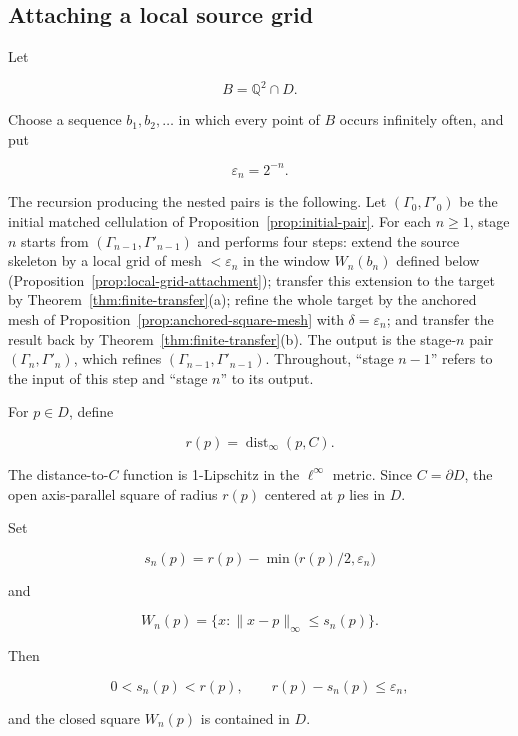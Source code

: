 \documentclass[11pt]{article}
\theoremstyle{mainplain}
\theoremstyle{mainroman}
\theoremstyle{definition}
\numberwithin{equation}{section}
\begin{document}
\subsection{Attaching a local source grid}\label{attaching-a-local-source-grid}

Let

\[
B=\mathbb Q^2\cap D.
\]

Choose a sequence \(b_1,b_2,\ldots\) in which every point of \(B\) occurs infinitely often, and put

\[
\varepsilon_n=2^{-n}.
\]

The recursion producing the nested pairs is the following. Let
\((\Gamma_0,\Gamma'_0)\) be the initial matched cellulation of
Proposition~\ref{prop:initial-pair}. For each \(n\ge1\), stage \(n\)
starts from \((\Gamma_{n-1},\Gamma'_{n-1})\) and performs four steps:
extend the source skeleton by a local grid of mesh
\(<\varepsilon_n\) in the window \(W_n(b_n)\) defined below
(Proposition~\ref{prop:local-grid-attachment}); transfer this
extension to the target by
Theorem~\ref{thm:finite-transfer}\textup{(a)}; refine the whole target
by the anchored mesh of Proposition~\ref{prop:anchored-square-mesh}
with \(\delta=\varepsilon_n\); and transfer the result back by
Theorem~\ref{thm:finite-transfer}\textup{(b)}. The output is the
stage-\(n\) pair \((\Gamma_n,\Gamma'_n)\), which refines
\((\Gamma_{n-1},\Gamma'_{n-1})\). Throughout, ``stage \(n-1\)''
refers to the input of this step and ``stage \(n\)'' to its output.

For \(p\in D\), define

\[
r(p)=\operatorname{dist}_\infty(p,C).
\]

The distance-to-\(C\) function is 1-Lipschitz in the \(\ell^\infty\) metric. Since \(C=\partial D\), the open axis-parallel square of radius \(r(p)\) centered at \(p\) lies in \(D\).

Set

\[
s_n(p)
 =
r(p)-\min\bigl(r(p)/2,\varepsilon_n\bigr)
\]

and

\[
W_n(p)
 =
\{x:\|x-p\|_\infty\le s_n(p)\}.
\]

Then

\[
0<s_n(p)<r(p),
\qquad
r(p)-s_n(p)\le\varepsilon_n,
\]

and the closed square \(W_n(p)\) is contained in \(D\).
\end{document}
